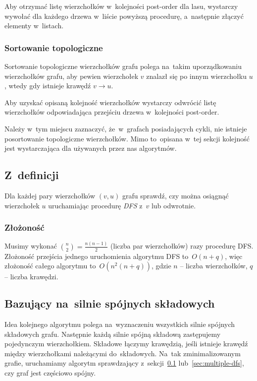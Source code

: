 \documentclass[a4paper,12pt]{mwart}
\begin{document}
Aby otrzymać listę wierzchołków w~kolejności post-order dla lasu, wystarczy
wywołać dla każdego drzewa w~liście powyższą procedurę, a~następnie złączyć
elementy w~listach.

\subsubsection{Sortowanie topologiczne}

Sortowanie topologiczne wierzchołków grafu polega na~takim uporządkowaniu
wierzchołków grafu, aby pewien wierzchołek $v$ znalazł się po innym wierzchołku
$u$, wtedy gdy istnieje krawędź $v \to u$.

Aby uzyskać opisaną kolejność wierzchołków wystarczy odwrócić listę
wierzchołków odpowiadająca przejściu drzewa w~kolejności post-order.

Należy w~tym miejscu zaznaczyć, że~w~grafach posiadających cykli, nie istnieje
posortowanie topologiczne wierzchołków. Mimo to~opisana w~tej sekcji kolejność
jest wystarczająca dla używanych przez nas algorytmów.

\subsection{Z~definicji}
\label{sec:from-definion-alg}

Dla każdej pary wierzchołków $(v, u)$ grafu sprawdź, czy można osiągnąć
wierzchołek $u$ uruchamiając procedurę \emph{DFS} z~$v$ lub odwrotnie.

\subsubsection{Złożoność}

Musimy wykonać ${n \choose 2} = \frac{n(n - 1)}{2}$ (liczba par wierzchołków)
razy procedurę DFS\@. Złożoność przejścia jednego uruchomienia algorytmu DFS
to~$O(n + q)$, więc złożoność całego algorytmu to~$O(n^2(n + q))$, gdzie $n$ --
liczba wierzchołków, $q$ -- liczba krawędzi.

\subsection{Bazujący na~silnie spójnych składowych}

Idea kolejnego algorytmu polega na~wyznaczeniu wszystkich silnie spójnych
składowych grafu. Następnie każdą silnie spójną składową zastępujemy
pojedynczym wierzchołkiem. Składowe łączymy krawędzią, jeśli istnieje krawędź
między wierzchołkami należącymi do~składowych. Na~tak zminimalizowanym grafie,
uruchamiamy algorytm sprawdzający z~sekcji~\ref{sec:from-definion-alg}
lub~\ref{sec:multiple-dfs}, czy graf jest częściowo spójny.
\end{document}
